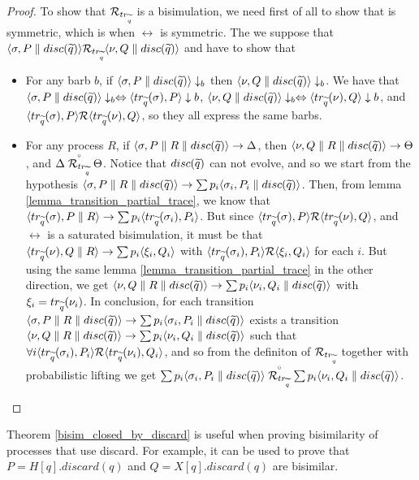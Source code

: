 \begin{proof}
To show that $\mathcal{R}_{tr_{\widetilde{q}}}$ is a bisimulation, we need first of all to show that is symmetric, which is when $\rel$ is symmetric. The we suppose that $\langle\sigma, P \parallel disc(\widetilde{q})\rangle \mathcal{R}_{tr_{\widetilde{q}}} \langle\nu, Q \parallel disc(\widetilde{q})\rangle$ and have to show that \begin{itemize}
\item For any barb $b$, if $\langle\sigma, P \parallel disc(\widetilde{q})\rangle \downarrow_b$ then $\langle\nu, Q \parallel disc(\widetilde{q})\rangle \downarrow_b$. We have that $\langle\sigma, P \parallel disc(\widetilde{q})\rangle \downarrow_b \Leftrightarrow \langle tr_{\widetilde{q}}(\sigma), P\rangle \downarrow b$, $\langle\nu, Q \parallel disc(\widetilde{q})\rangle \downarrow_b \Leftrightarrow \langle tr_{\widetilde{q}}(\nu), Q\rangle \downarrow b$, and 
$\langle tr_{\widetilde{q}}(\sigma), P\rangle \mathcal{R} \langle tr_{\widetilde{q}}(\nu), Q\rangle$, so they all express the same barbs.
\item For any process $R$, if $\langle\sigma, P \parallel R \parallel disc(\widetilde{q})\rangle \rightarrow \Delta$, then $\langle\nu, Q \parallel R \parallel disc(\widetilde{q})\rangle \rightarrow \Theta$, and $\Delta \stackrel{\scriptscriptstyle \circ}{\mathcal{R}_{tr_{\widetilde{q}}}} \Theta$. Notice that $disc(\widetilde{q})$ can not evolve, and so we start from the hypothesis $\langle\sigma, P \parallel R \parallel disc(\widetilde{q})\rangle \rightarrow \sum p_i \langle\sigma_i, P_i \parallel disc(\widetilde{q})\rangle$. Then, from lemma \ref{lemma_transition_partial_trace}, we know that $\langle tr_{\widetilde{q}}(\sigma), P\parallel R\rangle \rightarrow \sum p_i \langle tr_{\widetilde{q}}(\sigma_i), P_i\rangle$. But since $\langle tr_{\widetilde{q}}(\sigma), P\rangle \mathcal{R} \langle tr_{\widetilde{q}}(\nu), Q\rangle$, and $\rel$ is a saturated bisimulation, it must be that $\langle tr_{\widetilde{q}}(\nu), Q\parallel R\rangle \rightarrow \sum p_i \langle\xi_i, Q_i\rangle$ with $\langle tr_{\widetilde{q}}(\sigma_i), P_i\rangle \mathcal{R} \langle\xi_i, Q_i\rangle$ for each $i$. But using the same lemma \ref{lemma_transition_partial_trace} in the other direction, we get $\langle\nu, Q \parallel R \parallel disc(\widetilde{q})\rangle \rightarrow \sum p_i \langle\nu_i, Q_i \parallel disc(\widetilde{q})\rangle$ with $\xi_i = tr_{\widetilde{q}}(\nu_i)$. In conclusion, for each transition $\langle\sigma, P \parallel R \parallel disc(\widetilde{q})\rangle \rightarrow \sum p_i \langle\sigma_i, P_i \parallel disc(\widetilde{q})\rangle$ exists a transition $\langle\nu, Q \parallel R \parallel disc(\widetilde{q})\rangle \rightarrow \sum p_i \langle\nu_i, Q_i \parallel disc(\widetilde{q})\rangle$ such that $\forall i \langle tr_{\widetilde{q}}(\sigma_i), P_i\rangle \mathcal{R} \langle tr_{\widetilde{q}}(\nu_i), Q_i\rangle$, and so from the definiton of $\mathcal{R}_{tr_{\widetilde{q}}}$ together with probabilistic lifting we get $\sum p_i \langle\sigma_i, P_i \parallel disc(\widetilde{q})\rangle \stackrel{\scriptscriptstyle \circ}{\mathcal{R}_{tr_{\widetilde{q}}}} \sum p_i \langle\nu_i, Q_i \parallel disc(\widetilde{q})\rangle$.
\end{itemize}
\end{proof}



Theorem \ref{bisim_closed_by_discard} is useful when proving bisimilarity of processes that use discard. For example, it can be used to prove that $P = H[q].discard(q)$ and $Q = X[q].discard(q)$ are bisimilar.

